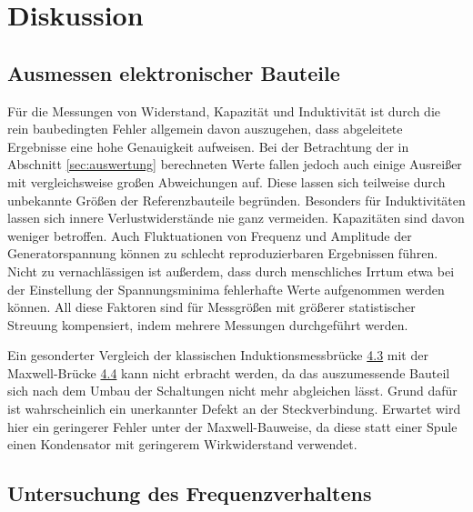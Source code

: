\section{Diskussion}
\label{sec:diskussion}

\subsection{Ausmessen elektronischer Bauteile}

Für die Messungen von Widerstand, Kapazität und Induktivität ist durch die rein baubedingten Fehler
allgemein davon auszugehen, dass abgeleitete Ergebnisse eine hohe Genauigkeit aufweisen. Bei der
Betrachtung der in Abschnitt \ref{sec:auswertung} berechneten Werte fallen jedoch auch einige Ausreißer
mit vergleichsweise großen Abweichungen auf. Diese lassen sich teilweise durch unbekannte Größen
der Referenzbauteile begründen. Besonders für Induktivitäten lassen sich innere Verlustwiderstände nie
ganz vermeiden. Kapazitäten sind davon weniger betroffen. Auch Fluktuationen von Frequenz und Amplitude
der Generatorspannung können zu schlecht reproduzierbaren Ergebnissen führen. Nicht zu vernachlässigen
ist außerdem, dass durch menschliches Irrtum etwa bei der Einstellung der Spannungsminima fehlerhafte
Werte aufgenommen werden können. All diese Faktoren sind für Messgrößen mit größerer statistischer
Streuung kompensiert, indem mehrere Messungen durchgeführt werden.

Ein gesonderter Vergleich der klassischen Induktionsmessbrücke \hyperref[sec:4.3]{4.3} mit der
Maxwell-Brücke \hyperref[sec:4.4]{4.4} kann nicht erbracht werden, da das auszumessende Bauteil
sich nach dem Umbau der Schaltungen nicht mehr abgleichen lässt. Grund dafür ist wahrscheinlich
ein unerkannter Defekt an der Steckverbindung. Erwartet wird hier ein geringerer Fehler unter der
Maxwell-Bauweise, da diese statt einer Spule einen Kondensator mit geringerem Wirkwiderstand verwendet.

\subsection{Untersuchung des Frequenzverhaltens}

